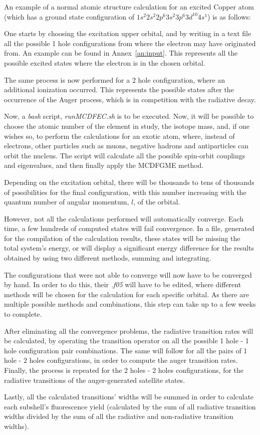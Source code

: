  An example of a normal atomic structure calculation for an excited Copper atom (which has a ground state configuration of $1s^2 2s^2 2p^6 3s^2 3p^6 3d^{10} 4s^1$) is as follows:

 One starts by choosing the excitation upper orbital, and by  writing in a text file all the possible 1 hole configurations from where the electron may have originated from. An example can be found in Annex~\ref{an:input}. This represents all the possible excited states where the electron is in the chosen orbital.
 
 The same process is now performed for a 2 hole configuration, where an additional ionization occurred. This represents the possible states after the occurrence of the Auger process, which is in competition with the radiative decay.

 Now, a \textit{bash} script, \textit{runMCDFEC.sh} is to be executed. Now, it will be possible to choose the atomic number of the element in study, the isotope mass, and, if one wishes so, to perform the calculations for an exotic atom, where, instead of electrons, other particles such as muons, negative hadrons and antiparticles can orbit the nucleus. 
 The script will calculate all the possible spin-orbit couplings and eigenvalues, and then finally apply the \gls{MCDFGME} method.

 Depending on the excitation orbital, there will be thousands to tens of thousands of possibilities for the final configuration, with this number increasing with the quantum number of angular momentum, $l$, of the orbital.
 
 However, not all the calculations performed will automatically converge. Each time, a few hundreds of computed states will fail convergence. In a file, generated for the compilation of the calculation results, these states will be missing the total system's energy, or will display a significant energy difference for the results obtained by using two different methods, summing and integrating.

 The configurations that were not able to converge will now have to be converged by hand. In order to do this, their \textit{.f05} will have to be edited, where different methods will be chosen for the calculation for each specific orbital. As there are multiple possible methods and combinations, this step can take up to a few weeks to complete.

 After eliminating all the convergence problems, the radiative transition rates will be calculated, by operating the transition operator on all the possible 1 hole - 1 hole configuration pair combinations. The same will follow for all the pairs of 1 hole - 2 holes configurations, in order to compute the auger transition rates. Finally, the process is repeated for the 2 holes - 2 holes configurations, for the radiative transitions of the auger-generated satellite states.


 Lastly, all the calculated transitions' widths will be summed in order to calculate each subshell's fluorescence yield (calculated by the sum of all radiative transition widths divided by the sum of all the radiative and non-radiative transition widths).
